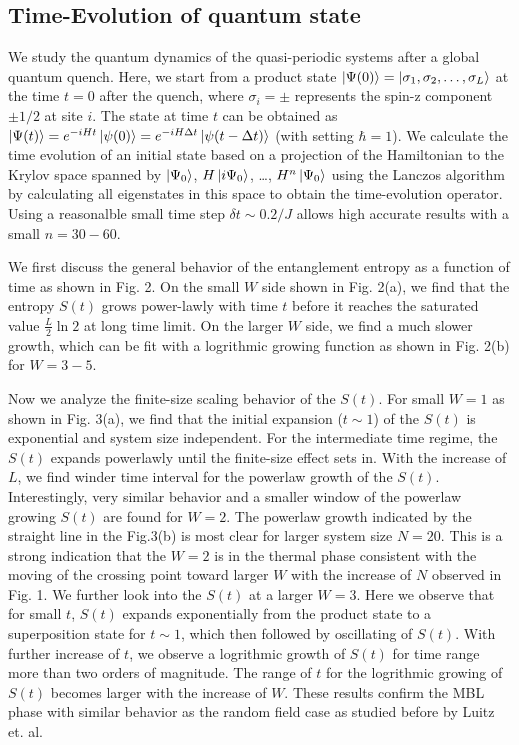 \documentclass[prl,aps,epsf,showpacs,twocolumn]{revtex4}
\begin{document}
\subsection{Time-Evolution of quantum state}

We study the quantum dynamics of the quasi-periodic systems after a global
quantum quench.  Here,  we start from a product state
$\ket{\Psi(0)}=\ket{\sigma_1, \sigma_2, \ldots , \sigma_L}$  at the time $t=0$
after the quench, where $\sigma_i=\pm$ represents  the spin-z component $\pm
1/2$ at site $i$.  The state at time $t$ can be obtained as $\ket{\Psi(t)} =
e^{-iHt}\ket{\psi(0)}=e^{-iH\Delta t}\ket{\psi(t-\Delta t)}$ (with setting $\hbar=1$).
We calculate the time evolution of an initial  state  based on  a projection of
the Hamiltonian to the Krylov space spanned by
$\ket{\Psi_0}$, $H\ket{i\Psi_0}$, \ldots, $H^n\ket{\Psi_0}$  using the Lanczos
algorithm by calculating all eigenstates in this space to obtain the
time-evolution operator\cite{luitz2015}.  Using a reasonalble small time step
$\delta t \sim 0.2/J$ allows high accurate results with a small $n=30-60$.


We first discuss the general behavior of the  entanglement entropy as a function
of time as shown in Fig. 2.  On the small $W$ side shown in Fig. 2(a),  we find
that the entropy $S(t)$ grows power-lawly with time $t$ before it reaches the
saturated value $\frac L 2 \ln2$ at long time limit.  On the larger  $W$ side,
we find a much slower growth, which can be fit with a logrithmic growing
function as shown in Fig. 2(b) for $W=3-5$.  


Now we analyze the finite-size scaling behavior of the $S(t)$.  For small $W=1$
as shown in Fig. 3(a),  we find that the initial expansion ($t\sim 1$) of the
$S(t)$ is exponential and system size independent.  For the intermediate time
regime,  the $S(t)$ expands powerlawly until the finite-size effect sets in.
With the increase of $L$,  we find winder time interval for the powerlaw growth
of  the $S(t)$.  Interestingly,  very similar behavior and a smaller window of
the powerlaw growing $S(t)$ are found for $W=2$.  The powerlaw growth indicated
by the straight line in the Fig.3(b) is most clear for larger system size
$N=20$.  This is a strong indication that the $W=2$  is in the thermal phase
consistent with the moving of the crossing point toward larger $W$ with the
increase of $N$ observed in Fig. 1.  We further look into the $S(t)$  at  a
larger $W=3$.  Here we observe that for  small $t$,  $S(t)$ expands
exponentially from the product state to a superposition state for $t\sim 1$,
which then followed by oscillating of $S(t)$.  With further increase of $t$,  we
observe a logrithmic growth of $S(t)$ for time range more than two orders of
magnitude.  The range of $t$ for the logrithmic growing  of $S(t)$ becomes
larger with the increase of $W$.   These results confirm the MBL phase with
similar behavior as the random field case as studied before by Luitz et.
al\cite{luitz2015}. 
\end{document}
